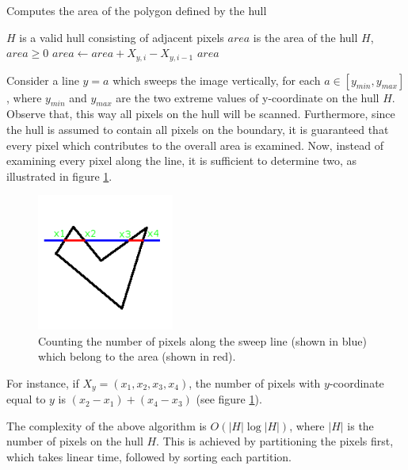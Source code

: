 \documentclass[times, utf8, zavrsni]{fer}
\begin{document}
\begin{algorithm} 
\caption{Computes the area of the polygon defined by the hull}
\label{algo:hull-area}
\begin{algorithmic}
\REQUIRE $H$ is a valid hull consisting of adjacent pixels
\ENSURE $area$ is the area of the hull $H$, $area \geq 0$
\STATE $area \gets area + X_{y,i} - X_{y, i - 1}$
\ENDFOR
\ENDFOR
\RETURN $area$
\end{algorithmic}
\end{algorithm}

Consider a line $y = a$ which sweeps the image vertically, for each $a \in
[y_{min}, y_{max}]$, where $y_{min}$ and $y_{max}$ are the two extreme values of
y-coordinate on the hull $H$. Observe that, this way all pixels on the hull will
be scanned. Furthermore, since the hull is assumed to contain all pixels on the
boundary, it is guaranteed that every pixel which contributes to the overall
area is examined. Now, instead of examining every pixel along the line, it is
sufficient to determine two, as illustrated in figure
\ref{image:shape-area}.

\begin{figure}[htb]
\caption{Counting the number of pixels along the sweep line (shown in blue)
which belong to the area (shown in red).}
\label{image:shape-area}
\centering
\includegraphics[width=0.4\textwidth]{images/shape-area}
\end{figure}

For instance, if $X_y = (x_1, x_2, x_3, x_4)$, the number of pixels with
$y$-coordinate equal to $y$ is $(x_2 - x_1) + (x_4 - x_3)$ (see figure
\ref{image:shape-area}).

The complexity of the above algorithm is $O(|H| \log |H|)$, where $|H|$ is the
number of pixels on the hull $H$. This is achieved by partitioning the pixels
first, which takes linear time, followed by sorting each partition.
\end{document}
